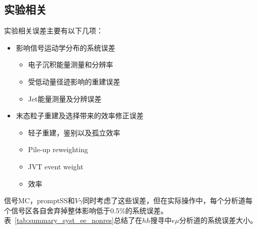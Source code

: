\subsection{实验相关}
实验相关误差主要有以下几项：
\begin{itemize}
  \item 影响信号运动学分布的系统误差
   \begin{itemize}
     \item 电子沉积能量测量和分辨率
     \item 受低动量径迹影响的\met 重建误差
     \item Jet能量测量及分辨误差
   \end{itemize}
   \item 末态粒子重建及选择带来的效率修正误差
    \begin{itemize}
      \item 轻子重建，鉴别以及孤立效率
      \item Pile-up reweighting
      \item JVT event weight
      \item \btag 效率
    \end{itemize}
\end{itemize}
信号MC，promptSS和$V\gamma$同时考虑了这些误差，但在实际操作中，每个分析道每个信号区各自舍弃掉整体影响低于0.5\%的系统误差。表~\ref{tab:summary_syst_ee_nonres}总结了在$hh$搜寻中$e\mu$分析道的系统误差大小。
